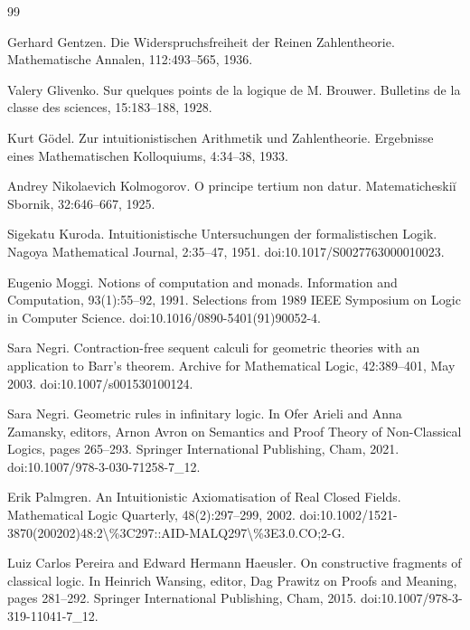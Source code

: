 \begin{thebibliography}{99}
\par\noindent    Gerhard Gentzen.  Die Widerspruchsfreiheit der Reinen Zahlentheorie.  Mathematische Annalen, 112:493–565, 1936.  

\par\noindent    Valery Glivenko.  Sur quelques points de la logique de M. Brouwer.  Bulletins de la classe des sciences, 15:183–188, 1928.  

\par\noindent    Kurt Gödel.  Zur intuitionistischen Arithmetik und Zahlentheorie.  Ergebnisse eines Mathematischen Kolloquiums, 4:34–38, 1933.  

\par\noindent    Andrey Nikolaevich Kolmogorov.  O principe tertium non datur.  Matematicheskiĭ Sbornik, 32:646–667, 1925.  

\par\noindent    Sigekatu Kuroda.  Intuitionistische Untersuchungen der formalistischen Logik.  Nagoya Mathematical Journal, 2:35–47, 1951.  doi:10.1017/S0027763000010023.  

\par\noindent    Eugenio Moggi.  Notions of computation and monads.  Information and Computation, 93(1):55–92, 1991.  Selections from 1989 IEEE Symposium on Logic in Computer Science.  doi:10.1016/0890-5401(91)90052-4.  

\par\noindent    Sara Negri.  Contraction-free sequent calculi for geometric theories with an application to Barr’s theorem.  Archive for Mathematical Logic, 42:389–401, May 2003.  doi:10.1007/s001530100124.  

\par\noindent    Sara Negri.  Geometric rules in infinitary logic.  In Ofer Arieli and Anna Zamansky, editors, Arnon Avron on Semantics and Proof Theory of Non-Classical Logics, pages 265–293. Springer International Publishing, Cham, 2021.  doi:10.1007/978-3-030-71258-7\_12.  

\par\noindent    Erik Palmgren.  An Intuitionistic Axiomatisation of Real Closed Fields.  Mathematical Logic Quarterly, 48(2):297–299, 2002.  doi:10.1002/1521-3870(200202)48:2\textbackslash{}\%3C297::AID-MALQ297\textbackslash{}\%3E3.0.CO;2-G.  

\par\noindent    Luiz Carlos Pereira and Edward Hermann Haeusler.  On constructive fragments of classical logic.  In Heinrich Wansing, editor, Dag Prawitz on Proofs and Meaning, pages 281–292. Springer International Publishing, Cham, 2015.  doi:10.1007/978-3-319-11041-7\_12.  


\end{thebibliography}
